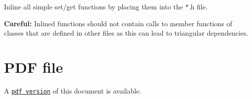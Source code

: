 \begin{DoxyItemize}
\item Inline all simple set/get functions by placing them into the $\ast$.h file.
\item {\bfseries Careful\+:} Inlined functions should not contain calls to member functions of classes that are defined in other files as this can lead to triangular dependencies.
\end{DoxyItemize}



 

 \hypertarget{index_pdf}{}\section{P\+D\+F file}\label{index_pdf}
A \href{../latex/refman.pdf}{\tt pdf version} of this document is available. 
